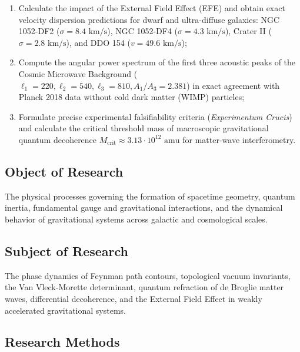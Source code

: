 \documentclass[11pt,a4paper]{article}
\theoremstyle{definition}
\begin{document}
\begin{enumerate}
\item Calculate the impact of the External Field Effect (EFE) and obtain exact velocity dispersion predictions for dwarf and ultra-diffuse galaxies: NGC 1052-DF2 ($\sigma = 8.4\text{ km/s}$), NGC 1052-DF4 ($\sigma = 4.3\text{ km/s}$), Crater II ($\sigma = 2.8\text{ km/s}$), and DDO 154 ($v = 49.6\text{ km/s}$);
\item Compute the angular power spectrum of the first three acoustic peaks of the Cosmic Microwave Background ($\ell_1=220, \ell_2=540, \ell_3=810, A_1/A_3=2.381$) in exact agreement with Planck 2018 data without cold dark matter (WIMP) particles;
\item Formulate precise experimental falsifiability criteria (\textit{Experimentum Crucis}) and calculate the critical threshold mass of macroscopic gravitational quantum decoherence $M_{\text{crit}} \approx 3.13 \cdot 10^{12}\text{ amu}$ for matter-wave interferometry.
\end{enumerate}

\subsection{Object of Research}\label{subsec:object}

The physical processes governing the formation of spacetime geometry, quantum inertia, fundamental gauge and gravitational interactions, and the dynamical behavior of gravitational systems across galactic and cosmological scales.

\subsection{Subject of Research}\label{subsec:subject}

The phase dynamics of Feynman path contours, topological vacuum invariants, the Van Vleck-Morette determinant, quantum refraction of de Broglie matter waves, differential decoherence, and the External Field Effect in weakly accelerated gravitational systems.

\subsection{Research Methods}\label{subsec:methods}
\end{document}
